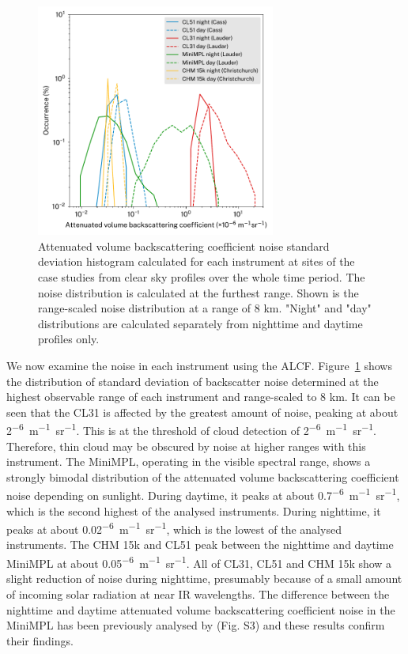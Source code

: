 \begin{figure}[t]
\centerline{\includegraphics[width=0.7\textwidth]{chapter3/fig/backscatter_sd_hist_rev2.pdf}}
\caption[Attenuated volume backscattering coefficient noise standard deviation histogram]{
Attenuated volume backscattering coefficient noise standard deviation histogram calculated for each instrument
at sites of the case studies from clear sky profiles over the whole time period.
The noise distribution is calculated at the furthest range. Shown is the
range-scaled noise distribution at a range of 8 km. "Night" and "day"
distributions are calculated separately from nighttime and daytime profiles only.
}
\label{fig:3:backscatter-sd-hist}
\end{figure}

We now examine the noise in each instrument using the ALCF.
Figure~\ref{fig:3:backscatter-sd-hist} shows the distribution of standard
deviation of backscatter noise determined at the highest observable range of each instrument
and range-scaled
to 8 km. It can be seen that the CL31 is affected by the greatest amount of noise,
peaking at about 2\unit{^{-6}m^{-1}sr^{-1}}. This is at the
threshold of cloud detection of 2\unit{^{-6}m^{-1}sr^{-1}}. Therefore,
thin cloud may be obscured by noise at higher ranges with this instrument. The MiniMPL,
operating in the visible spectral range, shows a strongly bimodal distribution of
the attenuated volume backscattering coefficient noise depending on sunlight. During daytime, it peaks at
about 0.7\unit{^{-6}m^{-1}sr^{-1}}, which is the second highest
of the analysed instruments. During nighttime, it peaks at about
0.02\unit{^{-6}m^{-1}sr^{-1}}, which is the lowest of the analysed
instruments. The CHM 15k and CL51 peak between the nighttime and daytime MiniMPL at about 0.05\unit{^{-6}m^{-1}sr^{-1}}.
All of CL31, CL51 and CHM 15k show a slight reduction of noise during nighttime,
presumably because of a small amount of incoming solar radiation at near IR
wavelengths.
The difference between the nighttime and daytime attenuated volume backscattering coefficient noise in the MiniMPL
has been previously analysed by \cite{silber2018} (Fig. S3) and these results confirm their findings.


